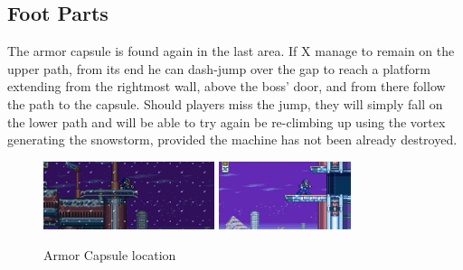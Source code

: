 \subsection{Foot Parts}
The armor capsule is found again in the last area. If X manage to remain on the upper path, from its end he can dash-jump over the gap to reach a platform extending from the rightmost wall, above the boss' door, and from there follow the path to the capsule. Should players miss the jump, they will simply fall on the lower path and will be able to try again be re-climbing up using the vortex generating the snowstorm, provided the machine has not been already destroyed.

\begin{figure}[htp]
	\centering
	\includegraphics[height=2cm]{figures/X3/Blizzard_buffalo/Armor_1.png}
	\includegraphics[height=2cm]{figures/X3/Blizzard_buffalo/Armor_3.jpg}
	\caption{Armor Capsule location}
\end{figure}

